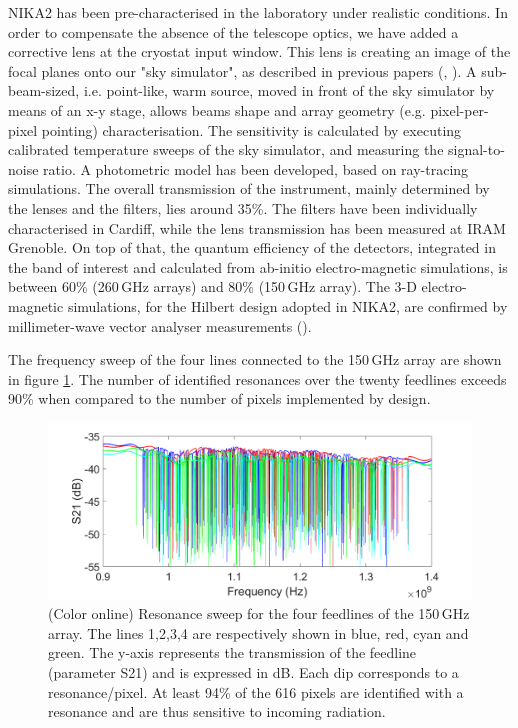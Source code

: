 \documentclass[]{aa} %
\begin{document}
NIKA2 has been pre-characterised in the laboratory under realistic conditions. In order to compensate the absence of the telescope optics, we have added a corrective lens at the cryostat input window. This lens is creating an image of the focal planes onto our "sky simulator", as described in previous papers (\cite{Catalano2014}, \cite{Monfardini2011}). A sub-beam-sized, i.e. point-like, warm source, moved in front of the sky simulator by means of an x-y stage, allows beams shape and array geometry (e.g. pixel-per-pixel pointing) characterisation. The sensitivity is calculated by executing calibrated temperature sweeps of the sky simulator, and measuring the signal-to-noise ratio. A photometric model has been developed, based on ray-tracing simulations. The overall transmission of the instrument, mainly determined by the lenses and the filters, lies around 35\%. The filters have been individually characterised in Cardiff, while the lens transmission has been measured at IRAM Grenoble. On top of that, the quantum efficiency of the detectors, integrated in the band of interest and calculated from ab-initio electro-magnetic simulations, is between 60\% (260\,GHz arrays) and 80\% (150\,GHz array). The 3-D electro-magnetic simulations, for the Hilbert design adopted in NIKA2, are confirmed by millimeter-wave vector analyser measurements (\cite{Roesch2012}).

The frequency sweep of the four lines connected to the 150\,GHz array are shown in figure \ref{VNA}. The number of identified resonances over the twenty feedlines exceeds 90\% when compared to the number of pixels implemented by design. 

\begin{figure}[h]
\begin{center}
   \centering
    \includegraphics[width=1.0\linewidth]{VNA_scans_150GHz.png}
    \caption{(Color online) Resonance sweep for the four feedlines of the 150\,GHz array. The lines 1,2,3,4 are respectively shown in blue, red, cyan and green. The y-axis represents the transmission of the feedline (parameter S21) and is expressed in dB. Each dip corresponds to a resonance/pixel. At least 94\% of the 616 pixels are identified with a resonance and are thus sensitive to incoming radiation.}
         \label{VNA}
\end{center}
\end{figure}
\end{document}
